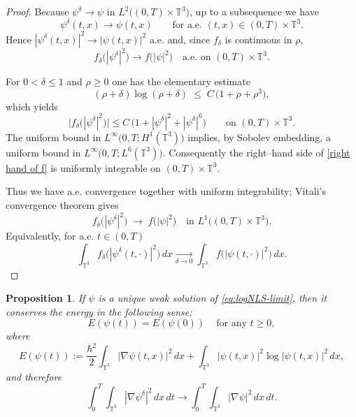 \documentclass[11pt]{article}
\newtheorem{proposition}{Proposition}
\begin{document}
\begin{proof}
Because \(\psi^{\delta}\to\psi\) in
\(L^{2}\bigl((0,T)\times \mathbb{T}^3\bigr)\), up to a subsequence we have
\[
\psi^{\delta}(t,x)\longrightarrow\psi(t,x)
\qquad\text{for a.e. }(t,x)\in(0,T)\times \mathbb{T}^3.
\]
Hence
\(|\psi^{\delta}(t,x)|^{2}\to|\psi(t,x)|^{2}\) a.e. and,
since \(f_{\delta}\) is continuous in \(\rho\),
\[
f_{\delta}\!\bigl(|\psi^{\delta}|^{2}\bigr)
\longrightarrow
f\!\bigl(|\psi|^{2}\bigr)
\quad\text{a.e. on }(0,T)\times \mathbb{T}^3.
\]

For \(0<\delta\le1\) and \(\rho\ge0\) one has the elementary estimate
\[
(\rho+\delta)\log(\rho+\delta)
\;\le\;
C\,\bigl(1+\rho+\rho^{3}\bigr),
\]
which yields
\begin{equation}
\label{right hand of f}
\bigl|f_{\delta}\!\bigl(|\psi^{\delta}|^{2}\bigr)\bigr|
\le
C\,\bigl(1+|\psi^{\delta}|^{2}+|\psi^{\delta}|^{6}\bigr)
\qquad\text{on }(0,T)\times \mathbb{T}^3.
\end{equation}
The uniform bound in
\(L^{\infty}\!\bigl(0,T;H^{1}(\mathbb{T}^3)\bigr)\) implies, by Sobolev
embedding, a uniform bound in
\(L^{\infty}\!\bigl(0,T;L^{6}(\mathbb{T}^3)\bigr)\).
Consequently the right–hand side of \eqref{right hand of f}  is uniformly integrable on
\((0,T)\times \mathbb{T}^3\).

Thus we have a.e. convergence together with uniform integrability;
Vitali’s convergence theorem gives
\[
f_{\delta}\!\bigl(|\psi^{\delta}|^{2}\bigr)
\;\longrightarrow\;
f\!\bigl(|\psi|^{2}\bigr)
\quad\text{in }L^{1}\!\bigl((0,T)\times \mathbb{T}^3\bigr).
\]
Equivalently, for a.e. \(t\in(0,T)\)
\[
\int_{\mathbb{T}^3}
f_{\delta}\!\bigl(|\psi^{\delta}(t,\cdot)|^{2}\bigr)\,dx
\xrightarrow[\delta\to0]{}
\int_{\mathbb{T}^3}
f\!\bigl(|\psi(t,\cdot)|^{2}\bigr)\,dx .
\]
\end{proof}













\begin{proposition}
\label{proposition-energy equality}
If   \(\psi\) is a unique weak solution of \eqref{eq:logNLS-limit}, then it conserves the energy in the following sense: 
\begin{equation}
\label{energy equality for Sho}
E(\psi(t))=E(\psi(0))\;\;\;\text{ for any } t\geq 0,\end{equation}
where 
\[
E(\psi(t))
:=
\frac{\hbar^2}{2}\int_{\mathbb{T}^3}|\nabla\psi(t,x)|^2\,dx
+
\int_{\mathbb{T}^3}|\psi(t,x)|^2\log|\psi(t,x)|^2\,dx,
\]
 and therefore
\begin{equation}\label{eq:local-kinetic-conv}
\int_0^T\int_{\mathbb{T}^3}|\nabla\psi^\delta|^2\,dx\,dt
\to
\int_0^T\int_{\mathbb{T}^3}|\nabla\psi|^2\,dx\,dt.
\end{equation}

\end{proposition}
\end{document}
